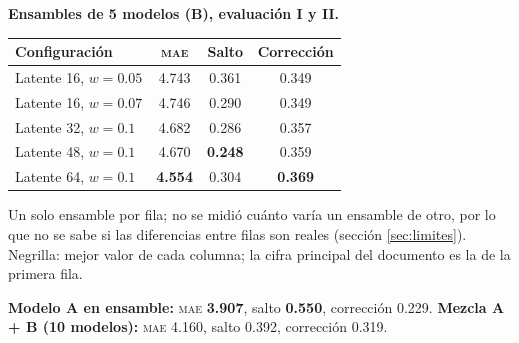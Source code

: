\documentclass[11pt,a4paper]{article}
\newcommand{\mae}{\textsc{mae}}
\begin{document}
\textbf{Ensambles de 5 modelos (B), evaluación I y II.}
\begin{center}
\begin{tabular}{lccc}
\toprule
Configuración & \mae{} & Salto & Corrección \\
\midrule
Latente 16, $w=0.05$ & 4.743 & 0.361 & 0.349 \\
Latente 16, $w=0.07$ & 4.746 & 0.290 & 0.349 \\
Latente 32, $w=0.1$ & 4.682 & 0.286 & 0.357 \\
Latente 48, $w=0.1$ & 4.670 & \textbf{0.248} & 0.359 \\
Latente 64, $w=0.1$ & \textbf{4.554} & 0.304 & \textbf{0.369} \\
\bottomrule
\end{tabular}
\end{center}
Un solo ensamble por fila; no se midió cuánto varía un ensamble de otro, por lo que no se sabe si las diferencias entre filas son reales (sección \ref{sec:limites}). Negrilla: mejor valor de cada columna; la cifra principal del documento es la de la primera fila.

\textbf{Modelo A en ensamble:} \mae{} \textbf{3.907}, salto \textbf{0.550}, corrección 0.229. \textbf{Mezcla A + B (10 modelos):} \mae{} 4.160, salto 0.392, corrección 0.319.
\end{document}
